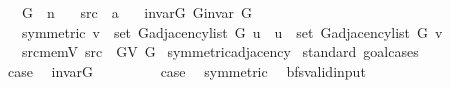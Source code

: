 \begin{isabellebody}
\ \ \ G\ {\isacharcolon}{\kern0pt}{\isacharcolon}{\kern0pt}\ {\isacharprime}{\kern0pt}n\isanewline
\ \ \ src\ {\isacharcolon}{\kern0pt}{\isacharcolon}{\kern0pt}\ {\isacharprime}{\kern0pt}a\isanewline
\ \ \ invar{\isacharunderscore}{\kern0pt}G{\isacharcolon}{\kern0pt}\ {\isachardoublequoteopen}G{\isachardot}{\kern0pt}invar\ G{\isachardoublequoteclose}\isanewline
\ \ \ symmetric{\isacharcolon}{\kern0pt}\ {\isachardoublequoteopen}v\ {\isasymin}\ set\ {\isacharparenleft}{\kern0pt}G{\isachardot}{\kern0pt}adjacency{\isacharunderscore}{\kern0pt}list\ G\ u{\isacharparenright}{\kern0pt}\ {\isasymlongleftrightarrow}\ u\ {\isasymin}\ set\ {\isacharparenleft}{\kern0pt}G{\isachardot}{\kern0pt}adjacency{\isacharunderscore}{\kern0pt}list\ G\ v{\isacharparenright}{\kern0pt}{\isachardoublequoteclose}\isanewline
\ \ \ src{\isacharunderscore}{\kern0pt}mem{\isacharunderscore}{\kern0pt}V{\isacharcolon}{\kern0pt}\ {\isachardoublequoteopen}src\ {\isasymin}\ G{\isachardot}{\kern0pt}V\ G{\isachardoublequoteclose}\isanewline
{}\isanewline
\isanewline
{}\isamarkupfalse%
\ symmetric{\isacharunderscore}{\kern0pt}adjacency%
\endisataginvisible
{\isafoldinvisible}%
%
\isadeliminvisible
\isanewline
%
\endisadeliminvisible
%
\isadelimproof
%
\endisadelimproof
%
\isatagproof
{}\isamarkupfalse%
\ {\isacharparenleft}{\kern0pt}standard{\isacharcomma}{\kern0pt}\ goal{\isacharunderscore}{\kern0pt}cases{\isacharparenright}{\kern0pt}\isanewline
\ \ \isamarkupfalse%
\ {}\isanewline
\ \ \isamarkupfalse%
\ {\isacharquery}{\kern0pt}case\ \isamarkupfalse%
\ invar{\isacharunderscore}{\kern0pt}G\ \isacommand{{\isachardot}{\kern0pt}}\isamarkupfalse%
\isanewline
{}\isamarkupfalse%
\isanewline
\ \ \isamarkupfalse%
\ {}\isanewline
\ \ \isamarkupfalse%
\ {\isacharquery}{\kern0pt}case\ \isamarkupfalse%
\ symmetric\ \isacommand{{\isachardot}{\kern0pt}}\isamarkupfalse%
\isanewline
{}\isamarkupfalse%
%
\endisatagproof
{\isafoldproof}%
%
\isadelimproof
\isanewline
%
\endisadelimproof
%
\isadeliminvisible
\isanewline
%
\endisadeliminvisible
%
\isataginvisible
{}\isamarkupfalse%
\ bfs{\isacharunderscore}{\kern0pt}valid{\isacharunderscore}{\kern0pt}input%
\endisataginvisible
{\isafoldinvisible}%
%
\isadeliminvisible
\isanewline
%
\endisadeliminvisible
%
\isadelimproof
%
\endisadelimproof
%
\isatagproof

\end{isabellebody}
